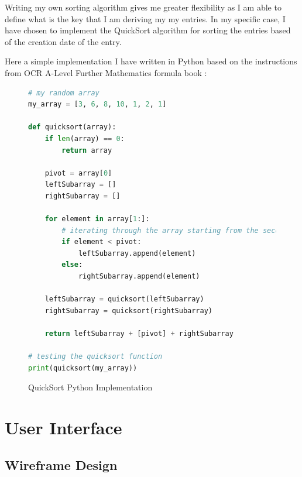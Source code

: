 Writing my own sorting algorithm gives me greater flexibility as I am able to define what is the key that I am deriving my my entries. In my specific case, I have chosen to implement the QuickSort algorithm for sorting the entries based of the creation date of the entry.

Here a simple implementation I have written in Python based on the instructions from OCR A-Level Further Mathematics formula book \cite{ocr2019furthermaths}:
\newpage
\begin{figure}[H]
    \begin{lstlisting}[language=Python]
# my random array
my_array = [3, 6, 8, 10, 1, 2, 1]

def quicksort(array):
    if len(array) == 0:
        return array

    pivot = array[0]
    leftSubarray = []
    rightSubarray = []

    for element in array[1:]:
        # iterating through the array starting from the second element to the end
        if element < pivot:
            leftSubarray.append(element)
        else:
            rightSubarray.append(element)

    leftSubarray = quicksort(leftSubarray)
    rightSubarray = quicksort(rightSubarray)

    return leftSubarray + [pivot] + rightSubarray

# testing the quicksort function
print(quicksort(my_array))
        \end{lstlisting}  
        \caption{QuickSort Python Implementation}

\end{figure}




\section{User Interface}
\subsection{Wireframe Design}

